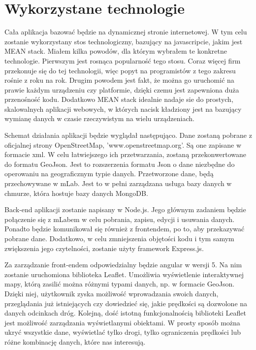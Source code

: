 


\section{Wykorzystane technologie}
\label{sec:wykorzystaneTechnologie}
	Cała aplikacja bazować będzie na dynamicznej stronie internetowej. W tym celu zostanie wykorzystany stos technologiczny, bazujący na javascripcie, jakim jest MEAN stack. Miałem kilka powodów, dla którym wybrałem te konkretne technologie. Pierwszym jest rosnąca popularność tego stosu. Coraz więcej firm przekonuje się do tej technologii, więc popyt na programistów z tego zakresu rośnie z roku na rok. Drugim powodem jest fakt, że można go uruchomić na prawie każdym urządzeniu czy platformie, dzięki czemu jest zapewniona duża przenośność kodu. Dodatkowo MEAN stack idealnie nadaje sie do prostych, skalowalnych aplikacji webowych, w których nacisk kładziony jest na bazujący wymianę danych w czasie rzeczywistym na wielu urządzeniach.

	Schemat działania aplikacji będzie wyglądał następująco. Dane zostaną pobrane z oficjalnej strony OpenStreetMap, 'www.openstreetmap.org'. Są one zapisane w formacie xml. W celu łatwiejszego ich przetwarzania, zostaną przekonwertowane do formatu GeoJson. Jest to rozszerzenia formatu Json o dane niezbędne do operowaniu na geograficznym typie danych. Przetworzone dane, będą przechowywane w mLab. Jest to w pełni zarządzana usługa bazy danych w chmurze, która hostuje bazy danych MongoDB.

	Back-end aplikacji zostanie napisany w Node.js. Jego głównym zadaniem będzie połączenie  się z mLabem w celu pobrania, zapisu, edycji i usuwania danych. Ponadto będzie komunikował się również z frontendem, po to, aby przekazywać pobrane dane.  Dodatkowo, w celu zmniejszenia objętości kodu i tym samym zwiększenia jego czytelności, zostanie użyty framework Express.js.

	Za zarządzanie front-endem odpowiedzialny będzie angular w wersji 5. Na nim zostanie uruchomiona biblioteka Leaflet. Umożliwia wyświetlenie interaktywnej mapy, którą zasilić można różnymi typami danych, np. w formacie GeoJson. Dzięki niej, użytkownik zyska możliwość wprowadzania swoich danych, przeglądania już istniejących czy dowiedzieć się, jakie prędkości są dozwolone na danych odcinkach dróg. Kolejną, dość istotną funkcjonalnością biblioteki Leaflet jest możliwość zarządzania wyświetlanymi obiektami. W prosty sposób można ukryć wszystkie dane, wyświetlać tylko drogi, tylko ograniczenia prędkości lub różne kombinację danych, które nas interesują.

